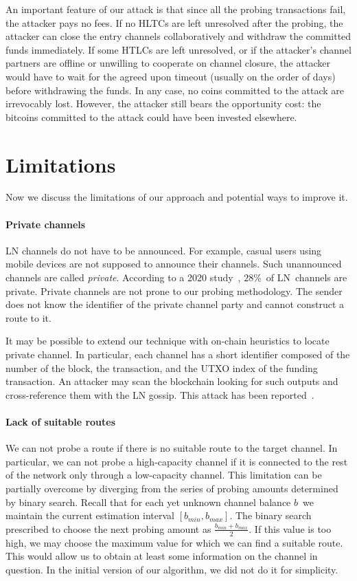 An important feature of our attack is that since all the probing transactions fail, the attacker pays no fees.
If no HLTCs are left unresolved after the probing, the attacker can close the entry channels collaboratively and withdraw the committed funds immediately.
If some HTLCs are left unresolved, or if the attacker's channel partners are offline or unwilling to cooperate on channel closure, the attacker would have to wait for the agreed upon timeout (usually on the order of days) before withdrawing the funds.
In any case, no coins committed to the attack are irrevocably lost.
However, the attacker still bears the opportunity cost: the bitcoins committed to the attack could have been invested elsewhere.


\section{Limitations}

Now we discuss the limitations of our approach and potential ways to improve it.

\paragraph{Private channels}

LN channels do not have to be announced.
For example, casual users using mobile devices are not supposed to announce their channels.
Such unannounced channels are called \textit{private}.
According to a 2020 study~\cite{BitMEXPrivateChannels}, $28$\%~of LN~channels are private.
Private channels are not prone to our probing methodology.
The sender does not know the identifier of the private channel party and cannot construct a route to it.

It may be possible to extend our technique with on-chain heuristics to locate private channel.
In particular, each channel has a short identifier composed of the number of the block, the transaction, and the UTXO index of the funding transaction.
An attacker may scan the blockchain looking for such outputs and cross-reference them with the LN gossip.
This attack has been reported~\cite{Pickhardt2020}.

\paragraph{Lack of suitable routes}

We can not probe a route if there is no suitable route to the target channel.
In particular, we can not probe a high-capacity channel if it is connected to the rest of the network only through a low-capacity channel.
This limitation can be partially overcome by diverging from the series of probing amounts determined by binary search.
Recall that for each yet unknown channel balance $b$~we maintain the current estimation interval $[b_{min}, b_{max}]$.
The binary search prescribed to choose the next probing amount as $\frac{b_{min} + b_{max}}{2}$.
If this value is too high, we may choose the maximum value for which we can find a suitable route.
This would allow us to obtain at least some information on the channel in question.
In the initial version of our algorithm, we did not do it for simplicity.

